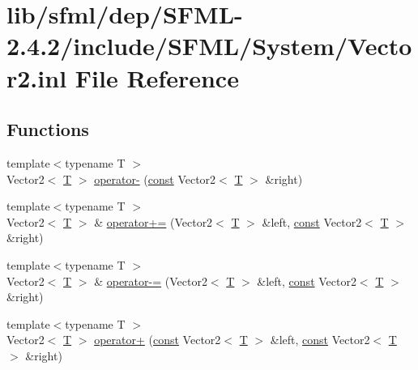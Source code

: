 \hypertarget{sfml_2dep_2_s_f_m_l-2_84_82_2include_2_s_f_m_l_2_system_2_vector2_8inl}{\section{lib/sfml/dep/\-S\-F\-M\-L-\/2.4.2/include/\-S\-F\-M\-L/\-System/\-Vector2.inl File Reference}
\label{sfml_2dep_2_s_f_m_l-2_84_82_2include_2_s_f_m_l_2_system_2_vector2_8inl}
}
\subsection*{Functions}
\begin{DoxyCompactItemize}
\item 
{\footnotesize template$<$typename T $>$ }\\Vector2$<$ \hyperlink{curses_8priv_8h_a5ef253115820acf7d27f3c5c3b02a0f0}{T} $>$ \hyperlink{sfml_2dep_2_s_f_m_l-2_84_82_2include_2_s_f_m_l_2_system_2_vector2_8inl_af6be5729d510689ad3bda16e2ee1052e}{operator-\/} (\hyperlink{term__entry_8h_a57bd63ce7f9a353488880e3de6692d5a}{const} Vector2$<$ \hyperlink{curses_8priv_8h_a5ef253115820acf7d27f3c5c3b02a0f0}{T} $>$ \&right)
\item 
{\footnotesize template$<$typename T $>$ }\\Vector2$<$ \hyperlink{curses_8priv_8h_a5ef253115820acf7d27f3c5c3b02a0f0}{T} $>$ \& \hyperlink{sfml_2dep_2_s_f_m_l-2_84_82_2include_2_s_f_m_l_2_system_2_vector2_8inl_a52734531787801fca563b63877cf8855}{operator+=} (Vector2$<$ \hyperlink{curses_8priv_8h_a5ef253115820acf7d27f3c5c3b02a0f0}{T} $>$ \&left, \hyperlink{term__entry_8h_a57bd63ce7f9a353488880e3de6692d5a}{const} Vector2$<$ \hyperlink{curses_8priv_8h_a5ef253115820acf7d27f3c5c3b02a0f0}{T} $>$ \&right)
\item 
{\footnotesize template$<$typename T $>$ }\\Vector2$<$ \hyperlink{curses_8priv_8h_a5ef253115820acf7d27f3c5c3b02a0f0}{T} $>$ \& \hyperlink{sfml_2dep_2_s_f_m_l-2_84_82_2include_2_s_f_m_l_2_system_2_vector2_8inl_a6dc66f95d609a2280bc5d0e8dc1871ec}{operator-\/=} (Vector2$<$ \hyperlink{curses_8priv_8h_a5ef253115820acf7d27f3c5c3b02a0f0}{T} $>$ \&left, \hyperlink{term__entry_8h_a57bd63ce7f9a353488880e3de6692d5a}{const} Vector2$<$ \hyperlink{curses_8priv_8h_a5ef253115820acf7d27f3c5c3b02a0f0}{T} $>$ \&right)
\item 
{\footnotesize template$<$typename T $>$ }\\Vector2$<$ \hyperlink{curses_8priv_8h_a5ef253115820acf7d27f3c5c3b02a0f0}{T} $>$ \hyperlink{sfml_2dep_2_s_f_m_l-2_84_82_2include_2_s_f_m_l_2_system_2_vector2_8inl_a629b6b51cf4ef3d9bef1b471096535c1}{operator+} (\hyperlink{term__entry_8h_a57bd63ce7f9a353488880e3de6692d5a}{const} Vector2$<$ \hyperlink{curses_8priv_8h_a5ef253115820acf7d27f3c5c3b02a0f0}{T} $>$ \&left, \hyperlink{term__entry_8h_a57bd63ce7f9a353488880e3de6692d5a}{const} Vector2$<$ \hyperlink{curses_8priv_8h_a5ef253115820acf7d27f3c5c3b02a0f0}{T} $>$ \&right)

\end{DoxyCompactItemize}
